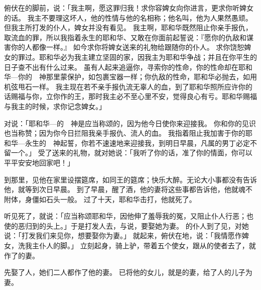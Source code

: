 {俯伏在{}的脚前，说：「我主啊，愿这罪归我！求你容婢女向你进言，更求你听婢女的话。
我主不要理这坏人{}，他的性情与他的名相称；他名叫{}，他为人果然愚顽。但我主所打发的仆人，婢女并没有看见。
我主啊，耶和华既然阻止你亲手报仇，取流血的罪，所以我指着永生的耶和华、又敢在你面前起誓说：『愿你的仇敌和谋害你的人都像{}一样。』
如今求你将婢女送来的礼物给跟随你的仆人。
求你饶恕婢女的罪过。耶和华必为我主建立坚固的家，因我主为耶和华争战；并且在你平生的日子查不出有什么过来。
虽有人起来追逼你，寻索你的性命，你的性命却在耶和华—你的　神那里蒙保护，如包裹宝器一样；你仇敌的性命，耶和华必抛去，如用机弦甩石一样。
我主现在若不亲手报仇流无辜人的血，到了耶和华照所应许你的话赐福与你，立你作{}的王，那时我主必不至心里不安，觉得良心有亏。耶和华赐福与我主的时候，求你记念婢女。」
\par }{\PP {}对{}说：「耶和华—{}的　神是应当称颂的，因为他今日使你来迎接我。
你和你的见识也当称赞；因为你今日拦阻我亲手报仇、流人的血。
我指着阻止我加害于你的耶和华—{}永生的　神起誓，你若不速速地来迎接我，到明日早晨，凡属{}的男丁必定不留一个。」
受了{}送来的礼物，就对她说：「我听了你的话，准了你的情面，你可以平平安安地回家吧！」
\par }{\PP {}到{}那里，见他在家里设摆筵席，如同王的筵席；{}快乐大醉。{}无论大小事都没有告诉他，就等到次日早晨。
到了早晨，{}醒了酒，他的妻将这些事都告诉他，他就魂不附体，身僵如石头一般。
过了十天，耶和华击打{}，他就死了。
\par }{\PP {}听见{}死了，就说：「应当称颂耶和华，因他伸了{}羞辱我的冤，又阻止仆人行恶；也使{}的恶归到{}的头上。」于是{}打发人去，与{}说，要娶她为妻。
的仆人到了{}见{}，对她说：「{}打发我们来见你，想要娶你为妻。」
就起来，俯伏在地，说：「我情愿作婢女，洗我主仆人的脚。」
立刻起身，骑上驴，带着五个使女，跟从{}的使者去了，就作了{}的妻。
\par }{\PP {}先娶了{}人{}，她们二人都作了他的妻。
已将他的女儿{}，就是{}的妻，给了{}人{}的儿子{}为妻。

}
